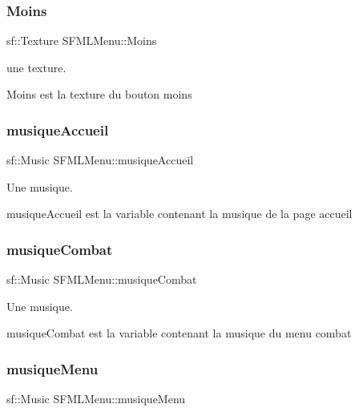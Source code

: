 \subsubsection{\texorpdfstring{Moins}{Moins}}
{\footnotesize\ttfamily sf\+::\+Texture S\+F\+M\+L\+Menu\+::\+Moins\hspace{0.3cm}{\ttfamily [private]}}



une texture. 

Moins est la texture du bouton moins \mbox{\label{class_s_f_m_l_menu_a5aebf65ce7c0123958599f7548498d7c}} 
\subsubsection{\texorpdfstring{musique\+Accueil}{musiqueAccueil}}
{\footnotesize\ttfamily sf\+::\+Music S\+F\+M\+L\+Menu\+::musique\+Accueil\hspace{0.3cm}{\ttfamily [private]}}



Une musique. 

musique\+Accueil est la variable contenant la musique de la page accueil \mbox{\label{class_s_f_m_l_menu_aa14d92454f208cac3d46c1241f9ca957}} 
\subsubsection{\texorpdfstring{musique\+Combat}{musiqueCombat}}
{\footnotesize\ttfamily sf\+::\+Music S\+F\+M\+L\+Menu\+::musique\+Combat\hspace{0.3cm}{\ttfamily [private]}}



Une musique. 

musique\+Combat est la variable contenant la musique du menu combat \mbox{\label{class_s_f_m_l_menu_abd6e2853990633fea892fced6bdf60d8}} 
\subsubsection{\texorpdfstring{musique\+Menu}{musiqueMenu}}
{\footnotesize\ttfamily sf\+::\+Music S\+F\+M\+L\+Menu\+::musique\+Menu\hspace{0.3cm}{\ttfamily [private]}}



